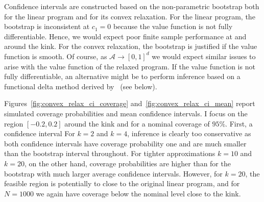\documentclass[12pt,a4paper,english]{article} %
\numberwithin{equation}{section}
\theoremstyle{definition}
\theoremstyle{remark}
\theoremstyle{plain}
\begin{document}
Confidence intervals are constructed based on the non-parametric bootstrap both for the linear program and for its convex relaxation.
For the linear program, the bootstrap is inconsistent at $c_1=0$ because the value function is not fully differentiable.
Hence, we would expect poor finite sample performance at and around the kink.
For the convex relaxation, the bootstrap is justified if the value function is smooth.
Of course, as $\mathcal{A}\to [0,1]^d$ we would expect similar issues to arise with the value function of the relaxed program.
If the value function is not fully differentiable, an alternative might be to perform inference based on a functional delta method derived by~\cite{shapiro1991asymptotic} (see below).

Figures~\ref{fig:convex_relax_ci_coverage} and~\ref{fig:convex_relax_ci_mean} report simulated coverage probabilities and mean confidence intervals.
I focus on the region $[-0.2, 0.2]$ around the kink and for a nominal coverage of $95\%$.
First, a confidence interval
For $k=2$ and $k=4$, inference is clearly too conservative as both confidence intervals have coverage probability one and are much smaller than the bootstrap interval throughout.
For tighter approximations $k=10$ and $k=20$, on the other hand, coverage probabilities are higher than for the bootstrap with much larger average confidence intervals.
However, for $k=20$, the feasible region is potentially to close to the original linear program, and for $N=1000$ we again have coverage below the nominal level close to the kink.
\end{document}

